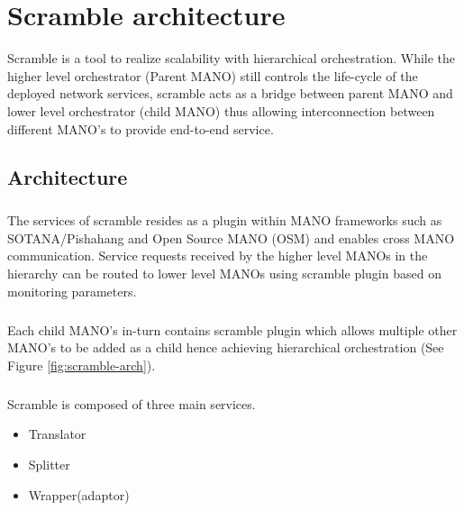 \chapter{Scramble architecture}
\label{ch:Scramble architecture}

Scramble is a tool to realize scalability with hierarchical orchestration. While the higher level orchestrator (Parent MANO) still controls the life-cycle of the deployed network services, scramble acts as a bridge between parent MANO and lower level orchestrator (child MANO) thus allowing interconnection between different MANO's to provide end-to-end service.  
 
\section{Architecture}
\paragraph{}
The services of scramble resides as a plugin within MANO frameworks such as SOTANA/Pishahang and Open Source MANO (OSM) and enables cross MANO communication. Service requests received by the higher level MANOs in the hierarchy can be routed to lower level MANOs using scramble plugin based on monitoring parameters.


\paragraph{}
Each child MANO's in-turn contains scramble plugin which allows multiple other MANO's to be added as a child hence achieving hierarchical orchestration (See Figure \ref{fig:scramble-arch}).

\paragraph{}

Scramble is composed of three main services.
\begin{itemize}
	\item Translator
	\item Splitter
	\item Wrapper(adaptor)
	\end{itemize} 

